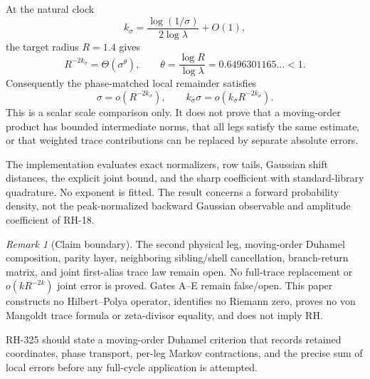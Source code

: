 \documentclass[11pt]{article}
\theoremstyle{remark}
\newtheorem{remark}[theorem]{Remark}
\begin{document}
At the natural clock
\[
 k_\sigma=\frac{\log(1/\sigma)}{2\log\lambda}+O(1),
\]
the target radius $R=1.4$ gives
\begin{equation}\label{eq:alias-scale}
 R^{-2k_\sigma}=\Theta(\sigma^\theta),
 \qquad
 \theta=\frac{\log R}{\log\lambda}
 =0.6496301165\ldots<1.
\end{equation}
Consequently the phase-matched local remainder satisfies
\[
 \sigma=o(R^{-2k_\sigma}),
 \qquad
 k_\sigma\sigma=o(k_\sigma R^{-2k_\sigma}).
\]
This is a scalar scale comparison only.  It does not prove that a
moving-order product has bounded intermediate norms, that all legs satisfy
the same estimate, or that weighted trace contributions can be replaced by
separate absolute errors.

The implementation evaluates exact normalizers, row tails, Gaussian shift
distances, the explicit joint bound, and the sharp coefficient with
standard-library quadrature.  No exponent is fitted.  The result concerns a
forward probability density, not the peak-normalized backward Gaussian
observable and amplitude coefficient of RH-18.

\begin{remark}[Claim boundary]
The second physical leg, moving-order Duhamel composition, parity layer,
neighboring sibling/shell cancellation, branch-return matrix, and joint
first-alias trace law remain open.  No full-trace replacement or
$o(kR^{-2k})$ joint error is proved.  Gates A--E remain false/open.  This
paper constructs no Hilbert--Polya operator, identifies no Riemann zero,
proves no von Mangoldt trace formula or zeta-divisor equality, and does not
imply RH.
\end{remark}

RH-325 should state a moving-order Duhamel criterion that records retained
coordinates, phase transport, per-leg Markov contractions, and the precise
sum of local errors before any full-cycle application is attempted.
\end{document}
